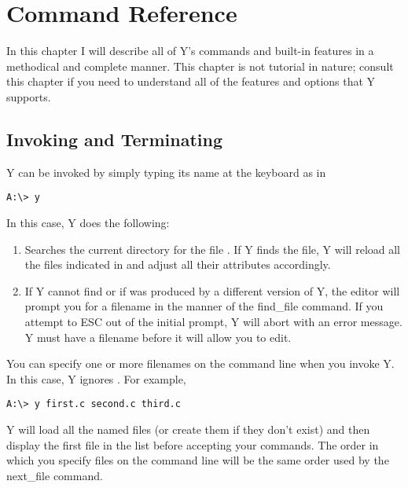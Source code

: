 
\chapter{Command Reference}

In this chapter I will describe all of Y's commands and built-in features in a methodical and
complete manner. This chapter is not tutorial in nature; consult this chapter if you need to
understand all of the features and options that Y supports.

\section{Invoking and Terminating}

Y can be invoked by simply typing its name at the keyboard as in

\begin{verbatim}
A:\> y
\end{verbatim}

In this case, Y does the following:

\begin{enumerate}

\item Searches the current directory for the file . If Y finds the file,
  Y will reload all the files indicated in  and adjust all their
  attributes accordingly.

\item If Y cannot find  or if  was produced by a
  different version of Y, the editor will prompt you for a filename in the manner of the
  find\_file command. If you attempt to ESC out of the initial prompt, Y will abort with an
  error message. Y must have a filename before it will allow you to edit.

\end{enumerate}

You can specify one or more filenames on the command line when you invoke Y. In this case, Y
ignores . For example,

\begin{verbatim}
A:\> y first.c second.c third.c
\end{verbatim}

Y will load all the named files (or create them if they don't exist) and then display the first
file in the list before accepting your commands. The order in which you specify files on the
command line will be the same order used by the next\_file command.

